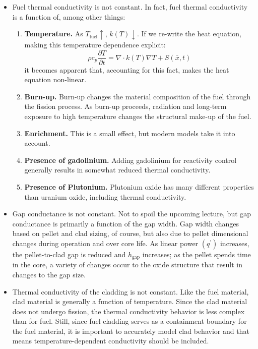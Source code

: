 \begin{itemize}
\item Fuel thermal conductivity is not constant. In fact, fuel thermal conductivity is a function of, among other things:
\begin{enumerate}
\item \textbf{Temperature.}  As $T_{\text{fuel}} \uparrow$, $k(T) \downarrow$. If we re-write the heat equation, making this temperature dependence explicit:
$$ \rho c_{p} \frac{\partial T}{\partial t} = \nabla \cdot k(T) \nabla T + S(\bar{x},t)$$
it becomes apparent that, accounting for this fact, makes the heat equation non-linear.
\item \textbf{Burn-up.} Burn-up changes the material composition of the fuel through the fission process.  As burn-up proceeds, radiation and long-term exposure to high temperature changes the structural make-up of the fuel. 
\item \textbf{Enrichment.}  This is a small effect, but modern models take it into account.
\item \textbf{Presence of gadolinium.}  Adding gadolinium for reactivity control generally results in somewhat reduced thermal conductivity.  
\item \textbf{Presence of Plutonium.}  Plutonium oxide has many different properties than uranium oxide, including thermal conductivity. 
\end{enumerate}
\item Gap conductance is not constant.  Not to spoil the upcoming lecture, but gap conductance is primarily a function of the gap width.  Gap width changes based on pellet and clad sizing, of course, but also due to pellet dimensional changes during operation and over core life.  As linear power $(q^{\prime})$ increases, the pellet-to-clad gap is reduced and $h_{\text{gap}}$ increases; as the pellet spends time in the core, a variety of changes occur to the oxide structure that result in changes to the gap size.

\item Thermal conductivity of the cladding is not constant.  Like the fuel material, clad material is generally a function of temperature.  Since the clad material does not undergo fission, the thermal conductivity behavior is less complex than for fuel.  Still, since fuel cladding serves as a containment boundary for the fuel material, it is important to accurately model clad behavior and that means temperature-dependent conductivity should be included.


\end{itemize}
